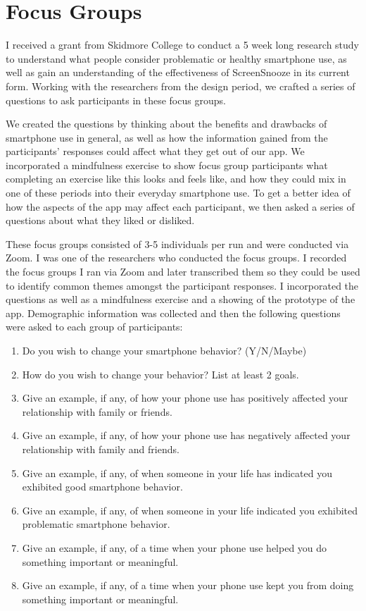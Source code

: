 \documentclass[12pt, title page, manuscript, nonacm]{acmart}
\begin{document}
\section*{Focus Groups}
I received a grant from Skidmore College to conduct a 5 week long
research study to understand what people consider problematic or healthy smartphone use, as well as gain an understanding of the effectiveness of ScreenSnooze in its current form. Working with the researchers from the design period, we crafted a series of questions to ask participants in these focus groups.

\par We created the questions by thinking about the benefits and drawbacks of smartphone use in general, as well as how the information gained from the participants' responses could affect what they get out of our app. We incorporated a mindfulness exercise to show focus group participants what completing an exercise like this looks and feels like, and how they could mix in one of these periods into their everyday smartphone use. To get a better idea of how the aspects of the app may affect each participant, we then asked a series of questions about what they liked or disliked. 
\par These focus groups consisted of 3-5 individuals per run and were conducted via Zoom. I was one of the researchers who conducted the focus groups. I recorded the focus groups I ran via Zoom and later transcribed them so they could be used to identify common themes amongst the participant responses. I incorporated the questions as well as a mindfulness exercise and a showing of the prototype of the app. Demographic information was collected and then the following questions were asked to each group of participants: 
\begin{enumerate}
    \item Do you wish to change your smartphone behavior? (Y/N/Maybe)\cite{ajibola2022disposition}
    \item How do you wish to change your behavior? List at least 2 goals.
    \item Give an example, if any, of how your phone use has positively affected your relationship with family or friends.
    \item Give an example, if any, of how your phone use has negatively affected your relationship with family and friends. 
    \item Give an example, if any, of when someone in your life has indicated you exhibited good smartphone behavior.
    \item Give an example, if any, of when someone in your life indicated you exhibited problematic smartphone behavior.
    \item Give an example, if any, of a time when your phone use helped you do something important or meaningful.
    \item Give an example, if any, of a time when your phone use kept you from doing something important or meaningful.
\end{enumerate}
\end{document}
